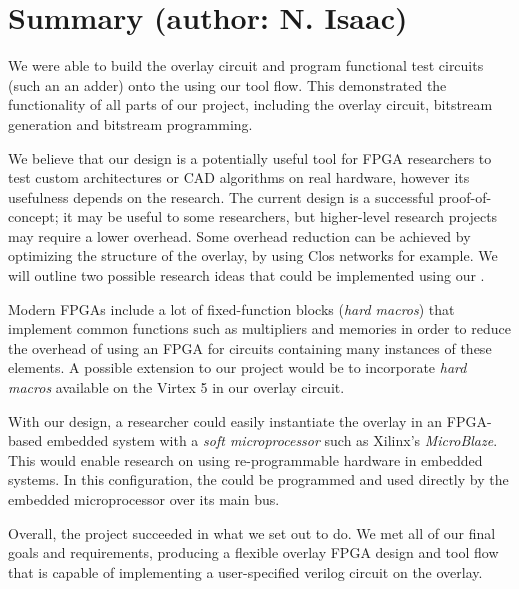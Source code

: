 \section{Summary (author: N. Isaac)} %

We were able to build the overlay circuit and program functional test circuits (such an an adder) onto the \overlay using our tool flow.
This demonstrated the functionality of all parts of our project, including the overlay circuit, bitstream generation and bitstream programming.

We believe that our design is a potentially useful tool for FPGA researchers to test custom architectures or CAD algorithms on real hardware, however its usefulness depends on the research.
The current design is a successful proof-of-concept; it may be useful to some researchers, but higher-level research projects may require a lower overhead.
Some overhead reduction can be achieved by optimizing the structure of the overlay, by using Clos networks for example.
We will outline two possible research ideas that could be implemented using our \overlay.

Modern FPGAs include a lot of fixed-function blocks (\emph{hard macros}) that implement common functions such as multipliers and memories in order to reduce the overhead of using an FPGA for circuits containing many instances of these elements.
A possible extension to our project would be to incorporate \emph{hard macros} available on the Virtex 5 in our overlay circuit.

With our \overlay design, a researcher could easily instantiate the overlay in an FPGA-based embedded system with a \emph{soft microprocessor} such as Xilinx's \emph{MicroBlaze}.
This would enable research on using re-programmable hardware in embedded systems.
In this configuration, the \overlay could be programmed and used directly by the embedded microprocessor over its main bus.

Overall, the project succeeded in what we set out to do.
We met all of our final goals and requirements, producing a flexible overlay FPGA design and tool flow that is capable of implementing a user-specified verilog circuit on the overlay.



